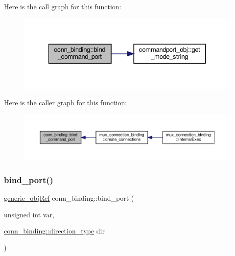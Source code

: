 Here is the call graph for this function\+:
\nopagebreak
\begin{figure}[H]
\begin{center}
\leavevmode
\includegraphics[width=327pt]{d2/db1/classconn__binding_ac7b383c69e3484e71b5f4d474af6c2f4_cgraph}
\end{center}
\end{figure}
Here is the caller graph for this function\+:
\nopagebreak
\begin{figure}[H]
\begin{center}
\leavevmode
\includegraphics[width=350pt]{d2/db1/classconn__binding_ac7b383c69e3484e71b5f4d474af6c2f4_icgraph}
\end{center}
\end{figure}
\mbox{\label{classconn__binding_a15ab7a8e03857a8a11ce016944f7aaab}} 
\subsubsection{\texorpdfstring{bind\+\_\+port()}{bind\_port()}}
{\footnotesize\ttfamily \hyperlink{generic__obj_8hpp_acb533b2ef8e0fe72e09a04d20904ca81}{generic\+\_\+obj\+Ref} conn\+\_\+binding\+::bind\+\_\+port (\begin{DoxyParamCaption}\item[{unsigned int}]{var,  }\item[{\hyperlink{classconn__binding_af1575e7a7dc7acd00fc5c947f413c663}{conn\+\_\+binding\+::direction\+\_\+type}}]{dir }\end{DoxyParamCaption})}



